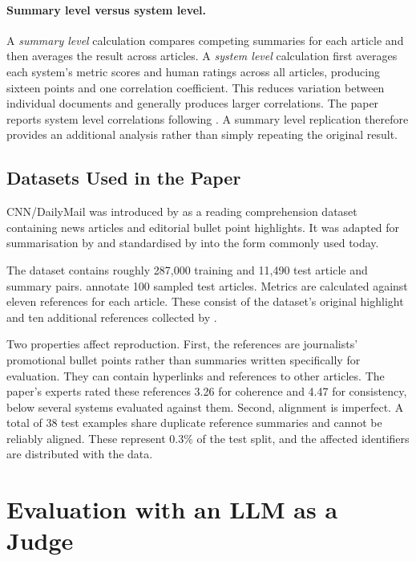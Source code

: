 \documentclass[11pt]{article}
\begin{document}
\paragraph{Summary level versus system level.}
A \emph{summary level} calculation compares competing summaries for each article and then averages the result across articles. A \emph{system level} calculation first averages each system's metric scores and human ratings across all articles, producing sixteen points and one correlation coefficient. This reduces variation between individual documents and generally produces larger correlations. The paper reports system level correlations following \citet{louis-nenkova-2013-automatically}. A summary level replication therefore provides an additional analysis rather than simply repeating the original result.

\subsection{Datasets Used in the Paper}
\label{sec:data}

CNN/DailyMail was introduced by \citet{hermann-etal-2015-teaching} as a reading comprehension dataset containing news articles and editorial bullet point highlights. It was adapted for summarisation by \citet{nallapati-etal-2016-abstractive} and standardised by \citet{see-etal-2017-get} into the form commonly used today.

The dataset contains roughly 287{,}000 training and 11{,}490 test article and summary pairs. \citet{fabbri-etal-2021-summeval} annotate 100 sampled test articles. Metrics are calculated against eleven references for each article. These consist of the dataset's original highlight and ten additional references collected by \citet{kryscinski-etal-2020-evaluating}.

Two properties affect reproduction. First, the references are journalists' promotional bullet points rather than summaries written specifically for evaluation. They can contain hyperlinks and references to other articles. The paper's experts rated these references 3.26 for coherence and 4.47 for consistency, below several systems evaluated against them. Second, alignment is imperfect. A total of 38 test examples share duplicate reference summaries and cannot be reliably aligned. These represent $0.3\%$ of the test split, and the affected identifiers are distributed with the data.

\section{Evaluation with an LLM as a Judge}
\label{sec:llmjudge}
\end{document}
